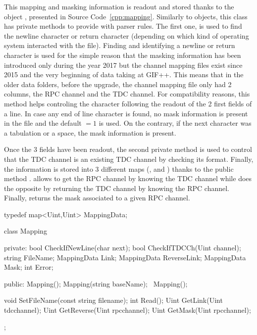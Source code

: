 	This mapping and masking information is readout and stored thanks to the object , presented in Source Code~\ref{cpp:mapping}. Similarly to  objects, this class has private methods to provide with parser rules. The first one,  is used to find the newline character  or return character  (depending on which kind of operating system interacted with the file). Finding and identifying a newline or return character is used for the simple reason that the masking information has been introduced only during the year 2017 but the channel mapping files exist since 2015 and the very beginning of data taking at GIF++. This means that in the older data folders, before the upgrade, the channel mapping file only had 2 columns, the RPC channel and the TDC channel. For compatibility reasons, this method helps controling the character following the readout of the 2 first fields of a line. In case any end of line character is found, no mask information is present in the file and the default  $=1$ is used. On the contrary, if the next character was a tabulation or a space, the mask information is present.
	
	Once the 3 fields have been readout, the second private method  is used to control that the TDC channel is an existing TDC channel by checking its format. Finally, the information is stored into 3 different maps (,  and ) thanks to the public method .  allows to get the RPC channel by knowing the TDC channel while  does the opposite by returning the TDC channel by knowing the RPC channel. Finally,  returns the mask associated to a given RPC channel.\\
	
	\begin{code}
	\begin{cppcode}
typedef map<Uint,Uint> MappingData;

class Mapping {
    private:
        bool        CheckIfNewLine(char next);
        bool        CheckIfTDCCh(Uint channel);
        string      FileName;
        MappingData Link;
        MappingData ReverseLink;
        MappingData Mask;
        int         Error;

    public:
        Mapping();
        Mapping(string baseName);
        ~Mapping();

        void SetFileName(const string filename);
        int Read();
        Uint GetLink(Uint tdcchannel);
        Uint GetReverse(Uint rpcchannel);
        Uint GetMask(Uint rpcchannel);
};
	\end{cppcode}
	\label{cpp:mapping}
	\vspace{5mm}
	\end{code}
	

